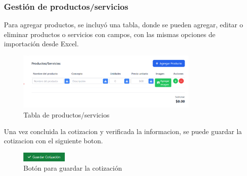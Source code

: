 \documentclass{Pretexto/bluereport}
\begin{document}
\subsubsection{Gestión de productos/servicios}

Para agregar productos, se incluyó una tabla, donde se pueden agregar, editar o eliminar productos o servicios con campos, con las mismas opciones de importación desde Excel.

\begin{figure}[H]
    \centering
    \includegraphics[width=0.8\textwidth]{img/tabla_productos.png}
    \caption{Tabla de productos/servicios}
    \label{fig:tabla_productos} 
\end{figure}

Una vez concluida la cotizacion y verificada la informacion, se puede guardar la cotizacion con el siguiente boton.

\begin{figure}[H]
    \centering
    \includegraphics[width=0.2\textwidth]{img/boton_guardar.png}
    \caption{Botón para guardar la cotización}
    \label{fig:boton_guardar}
\end{figure}
\end{document}
